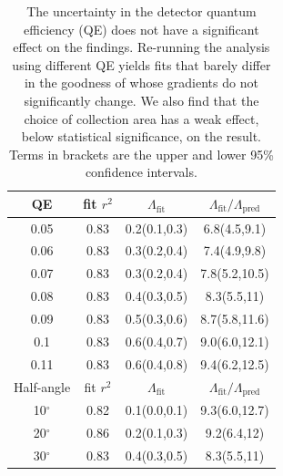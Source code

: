 	\begin{table}[b]
		\begin{tabular}{c c c c}
			\hline\hline
			QE & fit $r^2$ &  $\Lambda_\textrm{fit}$ & $\Lambda_\textrm{fit}/\Lambda_\textrm{pred}$\\      
			\hline
			0.05    &   0.83   &   0.2(0.1,0.3)  &  6.8(4.5,9.1)\\
			0.06    &   0.83   &   0.3(0.2,0.4)  &  7.4(4.9,9.8)\\
			0.07    &   0.83   &   0.3(0.2,0.4)  &  7.8(5.2,10.5)\\
			0.08    &   0.83   &   0.4(0.3,0.5)  &  8.3(5.5,11)\\
			0.09    &   0.83   &   0.5(0.3,0.6)  &  8.7(5.8,11.6)\\
			0.1     &   0.83   &   0.6(0.4,0.7)  &  9.0(6.0,12.1)\\
			0.11    &   0.83   &   0.6(0.4,0.8)  &  9.4(6.2,12.5)\\
			\hline
			Half-angle & fit $r^2$ &  $\Lambda_\textrm{fit}$ & $\Lambda_\textrm{fit}/\Lambda_\textrm{pred}$\\
			\hline
			10$^\circ$    &   0.82   &   0.1(0.0,0.1) &  9.3(6.0,12.7)\\
			20$^\circ$    &   0.86   &   0.2(0.1,0.3) &  9.2(6.4,12)\\
			30$^\circ$    &   0.83   &   0.4(0.3,0.5) &  8.3(5.5,11)\\
			\hline\hline
		\end{tabular}
		\caption{The uncertainty in the detector quantum efficiency (QE) does not have a significant effect on the findings. Re-running the analysis using different QE yields fits that barely differ in the goodness of whose gradients do not significantly change. We also find that the choice of collection area has a weak effect, below statistical significance, on the result. Terms in brackets are the upper and lower 95\% confidence intervals.}
		\label{tab:choice_indep}
	\end{table}



